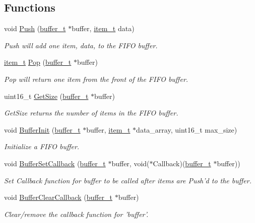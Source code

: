 \subsection*{Functions}
\begin{DoxyCompactItemize}
\item 
void \hyperlink{group__buffer_gace2f2a6d7a1b5fe4ce4fff31602da42a}{Push} (\hyperlink{structbuffer__t}{buffer\+\_\+t} $\ast$buffer, \hyperlink{group__buffer_gad9732dcc12e8aa91d552188c72dea329}{item\+\_\+t} data)
\begin{DoxyCompactList}\small\item\em Push will add one item, data, to the F\+I\+F\+O buffer. \end{DoxyCompactList}\item 
\hyperlink{group__buffer_gad9732dcc12e8aa91d552188c72dea329}{item\+\_\+t} \hyperlink{group__buffer_ga15e0136a546bc0d729a3151d5ffbcaaa}{Pop} (\hyperlink{structbuffer__t}{buffer\+\_\+t} $\ast$buffer)
\begin{DoxyCompactList}\small\item\em Pop will return one item from the front of the F\+I\+F\+O buffer. \end{DoxyCompactList}\item 
uint16\+\_\+t \hyperlink{group__buffer_ga01cf612935f5c2ae330920b78e8c8b9f}{Get\+Size} (\hyperlink{structbuffer__t}{buffer\+\_\+t} $\ast$buffer)
\begin{DoxyCompactList}\small\item\em Get\+Size returns the number of items in the F\+I\+F\+O buffer. \end{DoxyCompactList}\item 
void \hyperlink{group__buffer_gaf8383e89c549b8c212ebc6147bb5f4fc}{Buffer\+Init} (\hyperlink{structbuffer__t}{buffer\+\_\+t} $\ast$buffer, \hyperlink{group__buffer_gad9732dcc12e8aa91d552188c72dea329}{item\+\_\+t} $\ast$data\+\_\+array, uint16\+\_\+t max\+\_\+size)
\begin{DoxyCompactList}\small\item\em Initialize a F\+I\+F\+O buffer. \end{DoxyCompactList}\item 
void \hyperlink{group__buffer_gaa42698076e74a52bac047b35b3bf6b97}{Buffer\+Set\+Callback} (\hyperlink{structbuffer__t}{buffer\+\_\+t} $\ast$buffer, void($\ast$Callback)(\hyperlink{structbuffer__t}{buffer\+\_\+t} $\ast$buffer))
\begin{DoxyCompactList}\small\item\em Set Callback function for buffer to be called after items are Push'd to the buffer. \end{DoxyCompactList}\item 
void \hyperlink{group__buffer_ga56da56e8e27b583bd46efb4d391b53da}{Buffer\+Clear\+Callback} (\hyperlink{structbuffer__t}{buffer\+\_\+t} $\ast$buffer)
\begin{DoxyCompactList}\small\item\em Clear/remove the callback function for 'buffer'. \end{DoxyCompactList}\end{DoxyCompactItemize}


